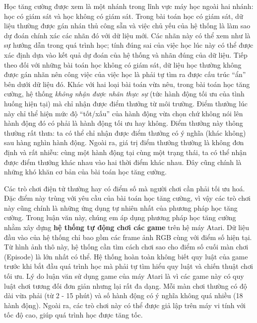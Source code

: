 Học tăng cường được xem là một nhánh trong lĩnh vực máy học ngoài hai nhánh: học có giám sát và học không có giám sát. Trong bài toán học có giám sát, dữ liệu thường được gán nhán thủ công sẵn và việc chủ yếu của hệ thống là làm sao dự đoán chính xác các nhãn đó với dữ liệu mới. Các nhãn này có thể xem như là sự hướng dẫn trong quá trình học; tính đúng sai của việc học lúc này có thể được xác định dựa vào kết quả dự đoán của hệ thống và nhãn đúng của dữ liệu. Tiếp theo đối với những bài toán học không có giám sát, dữ liệu học thường không được gán nhãn nên công việc của việc học là phải tự tìm ra được cấu trúc ``ẩn'' bên dưới dữ liệu đó. Khác với hai loại bài toán vừa nêu, trong bài toán học tăng cường, hệ thống \textit{không nhận được nhãn thực sự} (tức hành động tối ưu của tình huống hiện tại) mà chỉ nhận được điểm thưởng từ môi trường. Điểm thưởng lúc này chỉ thể hiện mức độ ``tốt/xấu'' của hành động vừa chọn chứ không nói lên hành động đó có phải là hành động tối ưu hay không. Điểm thưởng này thông thường rất thưa: ta có thể chỉ nhận được điểm thưởng có ý nghĩa (khác không) sau hàng nghìn hành động. Ngoài ra, giá trị điểm thưởng thường là không đơn định và rất nhiễu: cùng một hành động tại cùng một trạng thái, ta có thể nhận được điểm thưởng khác nhau vào hai thời điểm khác nhau. Đây cũng chính là những khó khăn cơ bản của bài toán học tăng cường.

Các trò chơi điện tử thường hay có điểm số mà người chơi cần phải tối ưu hoá. Đặc điểm này trùng với yêu cầu của bài toán học tăng cường, vì vậy các trò chơi này cũng chính là những ứng dụng tự nhiên nhất của phương pháp học tăng cường. Trong luận văn này, chúng em áp dụng phương pháp học tăng cường nhằm xây dựng \textbf{hệ thống tự động chơi các game} trên hệ máy Atari. Dữ liệu đầu vào của hệ thống chỉ bao gồm các frame ảnh RGB cùng với điểm số hiện tại. Từ hình ảnh thô này, hệ thống cần tìm cách chơi sao cho điểm số cuối màn chơi (Episode) là lớn nhất có thể. Hệ thống hoàn toàn không biết quy luật của game trước khi bắt đầu quá trình học mà phải tự tìm hiểu quy luật và chiến thuật chơi tối ưu. Lý do luận văn sử dụng game của máy Atari là vì các game này có quy luật chơi tương đối đơn giản nhưng lại rất đa dạng. Mỗi màn chơi thường có độ dài vừa phải (từ 2 - 15 phút) và số hành động có ý nghĩa không quá nhiều (18 hành động). Ngoài ra, các trò chơi này có thể được giả lập trên máy vi tính với tốc độ cao, giúp quá trình học được tăng tốc.


